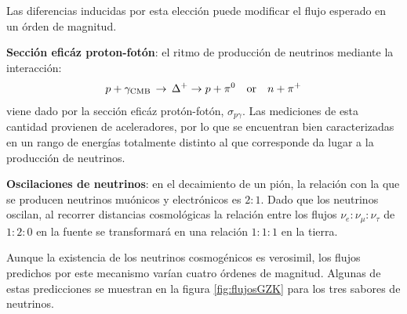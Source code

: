 	Las diferencias inducidas por esta elecci\'on puede modificar el flujo esperado en un \'orden de magnitud.
	
	\textbf{Secci\'on efic\'az proton-fot\'on}: el ritmo de producci\'on de neutrinos mediante la interacci\'on:
	\begin{displaymath}
	p + \gamma_{\rm CMB}\, \rightarrow\, \Delta^{+}  \rightarrow p +\pi^{0}\quad {\rm or}\quad n +\pi^{+}
	\end{displaymath}
	viene dado por la secci\'on efic\'az prot\'on-fot\'on, $\sigma_{p\gamma}$.
	Las mediciones de esta cantidad provienen de aceleradores, por lo que se encuentran bien caracterizadas en un rango de energ\'ias totalmente distinto al que corresponde da lugar a la producci\'on de neutrinos.
	
	\textbf{Oscilaciones de neutrinos}: en el decaimiento de un pi\'on, la relaci\'on con la que se producen neutrinos mu\'onicos y electr\'onicos es $2:1$. 
	Dado que los neutrinos oscilan, al recorrer distancias cosmol\'ogicas la relaci\'on entre los flujos $\nu_e :\nu_\mu :\nu_\tau$ de $1:2:0$ en la fuente se transformar\'a en una relaci\'on $1:1:1$ en la tierra.

	Aunque la existencia de los neutrinos cosmog\'enicos es verosimil, los flujos predichos por este mecanismo var\'ian cuatro \'ordenes de magnitud.
	Algunas de estas predicciones se muestran en la figura \ref{fig:flujosGZK} para los tres sabores de neutrinos.
	
